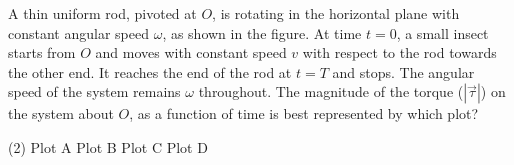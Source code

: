 
\item A thin uniform rod, pivoted at \( O \), is rotating in the horizontal plane with constant angular speed \( \omega \), as shown in the figure. At time \( t = 0 \), a small insect starts from \( O \) and moves with constant speed \( v \) with respect to the rod towards the other end. It reaches the end of the rod at \( t = T \) and stops. The angular speed of the system remains \( \omega \) throughout. The magnitude of the torque (\( |\vec{\tau}| \)) on the system about \( O \), as a function of time is best represented by which plot?
    \begin{center}
    \end{center}
    \begin{tasks}(2)
        \task Plot A
        \task Plot B
        \task Plot C
        \task Plot D
    \end{tasks}
